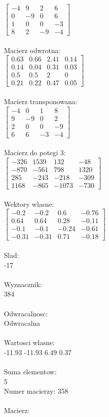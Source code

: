 \documentclass[a4paper,12pt]{article}
\begin{document}
$\begin{bmatrix} -4&9&2&6\\0&-9&0&6\\1&0&0&-3\\8&2&-9&-4 \end{bmatrix}$
\\
\\
Macierz odwrotna:\\

$\begin{bmatrix} 0.63&0.66&2.41&0.14\\0.14&0.04&0.31&0.03\\0.5&0.5&2&0\\0.21&0.22&0.47&0.05 \end{bmatrix}$
\\
\\
Macierz transponowana:\\

$\begin{bmatrix} -4&0&1&8\\9&-9&0&2\\2&0&0&-9\\6&6&-3&-4 \end{bmatrix}$
\\
\\
Macierz do potegi 3:\\

$\begin{bmatrix} -326&1539&132&-48\\-870&-561&798&1320\\285&-243&-218&-309\\1168&-865&-1073&-730 \end{bmatrix}$
\\
\\
Wektory wlasne:\\

$\begin{bmatrix} -0.2&-0.2&0.6&-0.76\\0.64&0.64&0.28&-0.11\\-0.1&-0.1&-0.24&-0.61\\-0.31&-0.31&0.71&-0.18 \end{bmatrix}$
\\
\\
Slad:\\
-17
\\
\\
Wyznacznik:\\
384
\\
\\
Odwracalnosc:\\
Odwracalna
\\
\\
Wartosci wlasne:\\
-11.93 -11.93 6.49 0.37
\\
\\
Suma elementow:\\
5
\\
\newpage
Numer macierzy:
358
\\
\\
Macierz:\\
\end{document}

